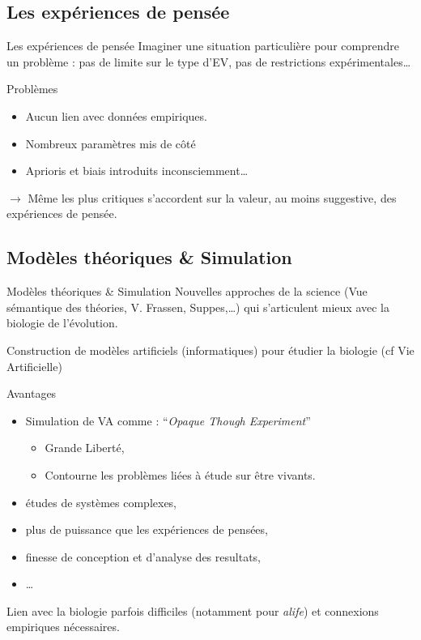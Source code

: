\documentclass[8pt, handout=show,notes=show]{beamer}
\begin{document}
\subsection{Les expériences de pensée}
\begin{frame}{Les expériences de pensée}
	Imaginer une situation particulière pour comprendre un problème : pas de limite sur le type d'EV, pas de restrictions expérimentales\dots
	\vfill
	\begin{alertblock}{Problèmes}
		\begin{itemize}
			\item Aucun lien avec données empiriques.
			\item Nombreux paramètres mis de côté
			\item Aprioris et biais introduits inconsciemment\ldots
		\end{itemize}
	\end{alertblock}
	\vfill
	$\rightarrow$ Même les plus critiques s'accordent sur la valeur, au moins suggestive, des expériences de pensée.
\end{frame}

\subsection{Modèles théoriques \& Simulation}
\begin{frame}{Modèles théoriques \& Simulation}
	Nouvelles approches de la science (Vue sémantique des théories, V. Frassen, Suppes,\dots) qui s'articulent mieux avec la biologie de l'évolution.
	\vfill

	Construction de modèles artificiels (informatiques) pour étudier la biologie (cf Vie Artificielle)

	\begin{block}{Avantages}
		\begin{itemize}
			\item Simulation de VA comme : ``\emph{Opaque Though Experiment}''
				\begin{itemize}
					\item Grande Liberté,
					\item Contourne les problèmes liées à étude sur être vivants.
				\end{itemize}
			\item études de systèmes complexes,
			\item plus de puissance que les expériences de pensées,
			\item finesse de conception et d'analyse des resultats,
			\item \dots
		\end{itemize}

	\end{block}

	\vfill
	
	Lien avec la biologie parfois difficiles (notamment pour \emph{alife}) et connexions empiriques nécessaires.

\end{frame}
\end{document}
